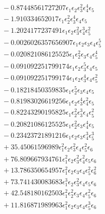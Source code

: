 \documentclass[10pt]{article}
\begin{document}
\begin{align*}
&{}  - 0.87448561727207 \epsilon_{1} \epsilon_{2} \epsilon_{3}^{2} \epsilon_{4}^{4} \epsilon_{5} \\
&{}  - 1.910334652017 \epsilon_{1} \epsilon_{2}^{2} \epsilon_{3}^{4} \epsilon_{4} \epsilon_{5} \\
&{}  - 1.2024177237491 \epsilon_{1} \epsilon_{2} \epsilon_{3}^{2} \epsilon_{4}^{3} \epsilon_{5}^{2} \\
&{}  - 0.0026026357656907 \epsilon_{1} \epsilon_{2} \epsilon_{3} \epsilon_{4} \epsilon_{5}^{5} \\
&{}  - 0.020821086125525 \epsilon_{1} \epsilon_{2}^{2} \epsilon_{3} \epsilon_{4} \epsilon_{5}^{4} \\
&{}  - 0.091092251799174 \epsilon_{1} \epsilon_{2} \epsilon_{3}^{5} \epsilon_{4} \epsilon_{5} \\
&{}  - 0.091092251799174 \epsilon_{1} \epsilon_{2} \epsilon_{3}^{4} \epsilon_{4} \epsilon_{5}^{2} \\
&{}  - 0.18218450359835 \epsilon_{1} \epsilon_{2}^{5} \epsilon_{3} \epsilon_{4} \epsilon_{5} \\
&{}  - 0.81983026619256 \epsilon_{1} \epsilon_{2} \epsilon_{3}^{4} \epsilon_{4}^{2} \epsilon_{5} \\
&{}  - 0.82243290195825 \epsilon_{1} \epsilon_{2}^{2} \epsilon_{3}^{3} \epsilon_{4} \epsilon_{5}^{2} \\
&{}  - 0.20821086125525 \epsilon_{1} \epsilon_{2}^{2} \epsilon_{3} \epsilon_{4}^{4} \epsilon_{5} \\
&{}  - 0.23423721891216 \epsilon_{1} \epsilon_{2} \epsilon_{3} \epsilon_{4}^{3} \epsilon_{5}^{3} \\
&{}  + 35.45061596989 \epsilon_{1}^{2} \epsilon_{2} \epsilon_{3}^{2} \epsilon_{4} \epsilon_{5}^{2} \epsilon_{6} \\
&{}  + 76.809667934761 \epsilon_{1}^{2} \epsilon_{2} \epsilon_{3}^{2} \epsilon_{4}^{2} \epsilon_{5} \epsilon_{6} \\
&{}  + 13.786350654957 \epsilon_{1}^{2} \epsilon_{2} \epsilon_{3} \epsilon_{4} \epsilon_{5}^{2} \epsilon_{6}^{2} \\
&{}  + 73.741430083683 \epsilon_{1}^{3} \epsilon_{2} \epsilon_{3}^{2} \epsilon_{4} \epsilon_{5} \epsilon_{6} \\
&{}  + 42.548180162503 \epsilon_{1}^{2} \epsilon_{2}^{2} \epsilon_{3} \epsilon_{4} \epsilon_{5}^{2} \epsilon_{6} \\
&{}  + 11.816871989963 \epsilon_{1}^{2} \epsilon_{2} \epsilon_{3} \epsilon_{4} \epsilon_{5}^{3} \epsilon_{6} \\

\end{align*}
\end{document}
